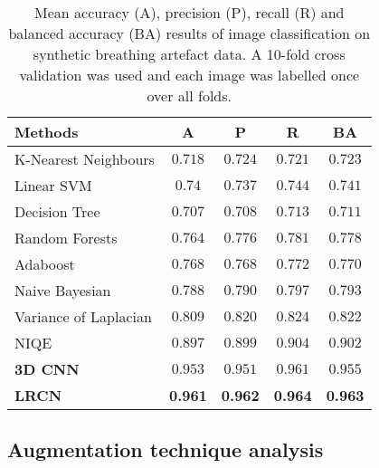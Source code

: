 \documentclass[preprint,12pt,authoryear]{elsarticle}
\begin{document}
\begin{table} 

\centering
\caption{Mean  accuracy (A), precision (P), recall (R) and balanced accuracy (BA) results of image classification on synthetic breathing artefact data. A 10-fold cross validation was used and each image was labelled once over all folds.}
\begin{tabular}{lcccc}
\hline
Methods    & A & P & R  & BA\\
\hline 

K-Nearest Neighbours  & $0.718$  & $0.724$  & $0.721$    & $0.723$     \\
Linear SVM    & $ 0.74 $  & $0.737$  & $0.744$  & $0.741$   \\
Decision Tree   &   $ 0.707 $  & $0.708$  & $0.713$  & $0.711$   \\
Random Forests   & $0.764$    & $0.776$  & $0.781$   & $0.778$  \\
Adaboost   & $0.768 $  & $0.768$  & $0.772$       & $0.770$   \\
Naive Bayesian   & $0.788 $  & $0.790$  & $0.797$    & $0.793$     \\
Variance of Laplacian  & $0.809$  & $0.820$ & $0.824$   & $0.822$   \\
NIQE \citep{Mittal2013}  & $0.897$  & $0.899 $& $0.904$  & $0.902$     \\
\hline

\textbf{3D CNN}    & $0.953$ & $0.951$ & $0.961$ &  $0.955$     \\
\textbf{LRCN}   & \textbf{0.961} & \textbf{0.962} & \textbf{0.964} &  \textbf{0.963}     \\

\hline
\end{tabular}
\label{table:synbreath}
\end{table}



\subsection{Augmentation technique analysis}
\label{sec:Quantitative}
\end{document}

